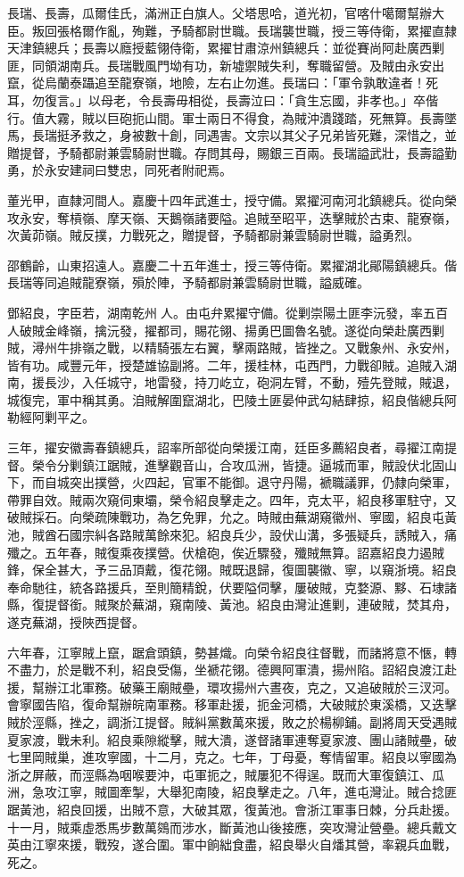 \begin{pinyinscope}
長瑞、長壽，瓜爾佳氏，滿洲正白旗人。父塔思哈，道光初，官喀什噶爾幫辦大臣。叛回張格爾作亂，殉難，予騎都尉世職。長瑞襲世職，授三等侍衛，累擢直隸天津鎮總兵；長壽以廕授藍翎侍衛，累擢甘肅涼州鎮總兵：並從賽尚阿赴廣西剿匪，同領湖南兵。長瑞戰風門坳有功，新墟禦賊失利，奪職留營。及賊由永安出竄，從烏蘭泰躡追至龍寮嶺，地險，左右止勿進。長瑞曰：「軍令孰敢違者！死耳，勿復言。」以母老，令長壽毋相從，長壽泣曰：「貪生忘國，非孝也。」卒偕行。值大霧，賊以巨砲扼山間。軍士兩日不得食，為賊沖潰踐踏，死無算。長壽墜馬，長瑞挺矛救之，身被數十創，同遇害。文宗以其父子兄弟皆死難，深惜之，並贈提督，予騎都尉兼雲騎尉世職。存問其母，賜銀三百兩。長瑞謚武壯，長壽謚勤勇，於永安建祠曰雙忠，同死者附祀焉。

董光甲，直隸河間人。嘉慶十四年武進士，授守備。累擢河南河北鎮總兵。從向榮攻永安，奪槓嶺、摩天嶺、天鵝嶺諸要隘。追賊至昭平，迭擊賊於古束、龍寮嶺，次黃茆嶺。賊反撲，力戰死之，贈提督，予騎都尉兼雲騎尉世職，謚勇烈。

邵鶴齡，山東招遠人。嘉慶二十五年進士，授三等侍衛。累擢湖北鄖陽鎮總兵。偕長瑞等同追賊龍寮嶺，殞於陣，予騎都尉兼雲騎尉世職，謚威確。

鄧紹良，字臣若，湖南乾州人。由屯弁累擢守備。從剿崇陽土匪李沅發，率五百人破賊金峰嶺，擒沅發，擢都司，賜花翎、揚勇巴圖魯名號。遂從向榮赴廣西剿賊，潯州牛排嶺之戰，以精騎張左右翼，擊兩路賊，皆挫之。又戰象州、永安州，皆有功。咸豐元年，授楚雄協副將。二年，援桂林，屯西門，力戰卻賊。追賊入湖南，援長沙，入任城守，地雷發，持刀屹立，砲洞左臂，不動，殪先登賊，賊退，城復完，軍中稱其勇。洎賊解圍竄湖北，巴陵土匪晏仲武勾結肆掠，紹良偕總兵阿勒經阿剿平之。

三年，擢安徽壽春鎮總兵，詔率所部從向榮援江南，廷臣多薦紹良者，尋擢江南提督。榮令分剿鎮江踞賊，進擊觀音山，合攻瓜洲，皆捷。逼城而軍，賊設伏北固山下，而自城突出撲營，火四起，官軍不能御。退守丹陽，褫職議罪，仍隸向榮軍，帶罪自效。賊兩次窺伺東壩，榮令紹良擊走之。四年，克太平，紹良移軍駐守，又破賊採石。向榮疏陳戰功，為乞免罪，允之。時賊由蕪湖窺徽州、寧國，紹良屯黃池，賊酋石國宗糾各路賊萬餘來犯。紹良兵少，設伏山溝，多張疑兵，誘賊入，痛殲之。五年春，賊復乘夜撲營。伏槍砲，俟近驟發，殲賊無算。詔嘉紹良力遏賊鋒，保全甚大，予三品頂戴，復花翎。賊既退歸，復圖襲徽、寧，以窺浙境。紹良奉命馳往，統各路援兵，至則簡精銳，伏要隘伺擊，屢破賊，克婺源、黟、石埭諸縣，復提督銜。賊聚於蕪湖，窺南陵、黃池。紹良由灣沚進剿，連破賊，焚其舟，遂克蕪湖，授陜西提督。

六年春，江寧賊上竄，踞倉頭鎮，勢甚熾。向榮令紹良往督戰，而諸將意不愜，轉不盡力，於是戰不利，紹良受傷，坐褫花翎。德興阿軍潰，揚州陷。詔紹良渡江赴援，幫辦江北軍務。破藥王廟賊壘，環攻揚州六晝夜，克之，又追破賊於三汊河。會寧國告陷，復命幫辦皖南軍務。移軍赴援，扼金河橋，大破賊於東溪橋，又迭擊賊於涇縣，挫之，調浙江提督。賊糾黨數萬來援，敗之於楊柳鋪。副將周天受遇賊夏家渡，戰未利。紹良乘隙縱擊，賊大潰，遂督諸軍連奪夏家渡、團山諸賊壘，破七里岡賊巢，進攻寧國，十二月，克之。七年，丁母憂，奪情留軍。紹良以寧國為浙之屏蔽，而涇縣為咽喉要沖，屯軍扼之，賊屢犯不得逞。既而大軍復鎮江、瓜洲，急攻江寧，賊圖牽掣，大舉犯南陵，紹良擊走之。八年，進屯灣沚。賊合捻匪踞黃池，紹良回援，出賊不意，大破其眾，復黃池。會浙江軍事日棘，分兵赴援。十一月，賊乘虛悉馬步數萬鵕而涉水，斷黃池山後接應，突攻灣沚營壘。總兵戴文英由江寧來援，戰歿，遂合圍。軍中餉絀食盡，紹良舉火自燔其營，率親兵血戰，死之。


\end{pinyinscope}
